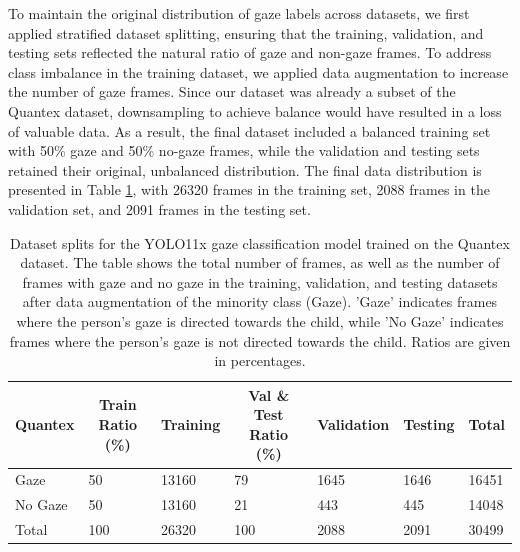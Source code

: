 \documentclass[
  man,floatsintext]{apa6}
\begin{document}
To maintain the original distribution of gaze labels across datasets, we first applied stratified dataset splitting, ensuring that the training, validation, and testing sets reflected the natural ratio of gaze and non-gaze frames. To address class imbalance in the training dataset, we applied data augmentation to increase the number of gaze frames. Since our dataset was already a subset of the Quantex dataset, downsampling to achieve balance would have resulted in a loss of valuable data. As a result, the final dataset included a balanced training set with 50\% gaze and 50\% no-gaze frames, while the validation and testing sets retained their original, unbalanced distribution. The final data distribution is presented in Table \ref{tab:gaze-dataset-splits}, with 26320 frames in the training set, 2088 frames in the validation set, and 2091 frames in the testing set.

\begin{table}[tbp]

\begin{center}
\begin{threeparttable}

\caption{\label{tab:gaze-dataset-splits}Dataset splits for the YOLO11x gaze classification model trained on the Quantex dataset. The table shows the total number of frames, as well as the number of frames with gaze and no gaze in the training, validation, and testing datasets after data augmentation of the minority class (Gaze). 'Gaze' indicates frames where the person's gaze is directed towards the child, while 'No Gaze' indicates frames where the person's gaze is not directed towards the child. Ratios are given in percentages.}

\begin{tabular}{lllllll}
\toprule
Quantex & \multicolumn{1}{c}{Train Ratio (\%)} & \multicolumn{1}{c}{Training} & \multicolumn{1}{c}{Val \& Test Ratio (\%)} & \multicolumn{1}{c}{Validation} & \multicolumn{1}{c}{Testing} & \multicolumn{1}{c}{Total}\\
\midrule
Gaze & 50 & 13160 & 79 & 1645 & 1646 & 16451\\
No Gaze & 50 & 13160 & 21 & 443 & 445 & 14048\\
Total & 100 & 26320 & 100 & 2088 & 2091 & 30499\\
\bottomrule
\end{tabular}

\end{threeparttable}
\end{center}

\end{table}
\end{document}
